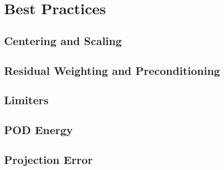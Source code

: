 \section{Best Practices}

\subsection{Centering and Scaling}\label{subsec:centerScale}

\subsection{Residual Weighting and Preconditioning}\label{subsec:resWeight}

\subsection{Limiters}

\subsection{POD Energy}

\subsection{Projection Error}\label{subsec:projError}

